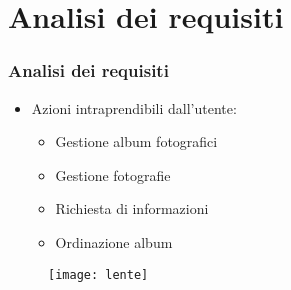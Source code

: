 
\section{Analisi dei requisiti}
\begin{frame}

  \frametitle{Analisi dei requisiti}

  \begin{itemize}
  \item Azioni intraprendibili dall'utente:
    \begin{itemize}
    \item Gestione album fotografici
    \item Gestione fotografie
    \item Richiesta di informazioni
    \item Ordinazione album
    \end{itemize}
  \end{itemize}

  \begin{figure}[H]
    \centering
    \texttt{[image: lente]}
  \end{figure}
\end{frame}

%  
